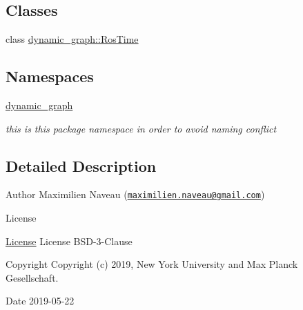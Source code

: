 \subsection*{Classes}
\begin{DoxyCompactItemize}
\item 
class \hyperlink{classdynamic__graph_1_1RosTime}{dynamic\+\_\+graph\+::\+Ros\+Time}
\end{DoxyCompactItemize}
\subsection*{Namespaces}
\begin{DoxyCompactItemize}
\item 
 \hyperlink{namespacedynamic__graph}{dynamic\+\_\+graph}
\begin{DoxyCompactList}\small\item\em this is this package namespace in order to avoid naming conflict \end{DoxyCompactList}\end{DoxyCompactItemize}


\subsection{Detailed Description}
\begin{DoxyAuthor}{Author}
Maximilien Naveau (\href{mailto:maximilien.naveau@gmail.com}{\tt maximilien.\+naveau@gmail.\+com}) 
\end{DoxyAuthor}
\begin{DoxyRefDesc}{License}
\item[\hyperlink{license__license000030}{License}]License B\+S\+D-\/3-\/\+Clause \end{DoxyRefDesc}
\begin{DoxyCopyright}{Copyright}
Copyright (c) 2019, New York University and Max Planck Gesellschaft. 
\end{DoxyCopyright}
\begin{DoxyDate}{Date}
2019-\/05-\/22 
\end{DoxyDate}
